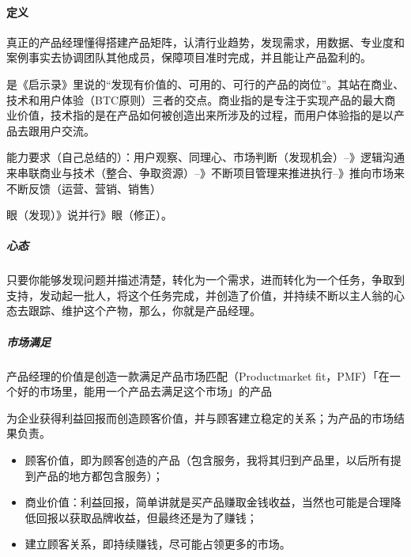 \documentclass[letterpaper,10pt,english]{sphinxmanual}
\begin{document}
\paragraph{定义}
\label{\detokenize{chapter_introduction/PM:id1}}
真正的产品经理懂得搭建产品矩阵，认清行业趋势，发现需求，用数据、专业度和案例事实去协调团队其他成员，保障项目准时完成，并且能让产品盈利的。
%
\begin{footnote}[160]\sphinxAtStartFootnote
{}
%
\end{footnote}是《启示录》里说的“发现有价值的、可用的、可行的产品的岗位”。其站在商业、技术和用户体验（BTC原则）三者的交点。商业指的是专注于实现产品的最大商业价值，技术指的是在产品如何被创造出来所涉及的过程，而用户体验指的是以产品去跟用户交流。%
\begin{footnote}[161]\sphinxAtStartFootnote
{}
%
\end{footnote}

能力要求（自己总结的）：用户观察、同理心、市场判断（发现机会）–》逻辑沟通来串联商业与技术（整合、争取资源）–》不断项目管理来推进执行–》推向市场来不断反馈（运营、营销、销售）

眼（发现）\sphinxhyphen{}》说并行\sphinxhyphen{}》眼（修正）。


\subparagraph{心态}
\label{\detokenize{chapter_introduction/PM:id2}}
只要你能够发现问题并描述清楚，转化为一个需求，进而转化为一个任务，争取到支持，发动起一批人，将这个任务完成，并创造了价值，并持续不断以主人翁的心态去跟踪、维护这个产物，那么，你就是产品经理。


\subparagraph{市场满足}
\label{\detokenize{chapter_introduction/PM:id3}}
产品经理的价值是创造一款满足产品\sphinxhyphen{}市场匹配（Product\sphinxhyphen{}market
fit，PMF）「在一个好的市场里，能用一个产品去满足这个市场」的产品
%
\begin{footnote}[162]\sphinxAtStartFootnote
{}
%
\end{footnote}

为企业获得利益回报而创造顾客价值，并与顾客建立稳定的关系；为产品的市场结果负责。
\begin{itemize}
\item {} 
顾客价值，即为顾客创造的产品（包含服务，我将其归到产品里，以后所有提到产品的地方都包含服务）；

\item {} 
商业价值：利益回报，简单讲就是买产品赚取金钱收益，当然也可能是合理降低回报以获取品牌收益，但最终还是为了赚钱；

\item {} 
建立顾客关系，即持续赚钱，尽可能占领更多的市场。

\end{itemize}
\end{document}
